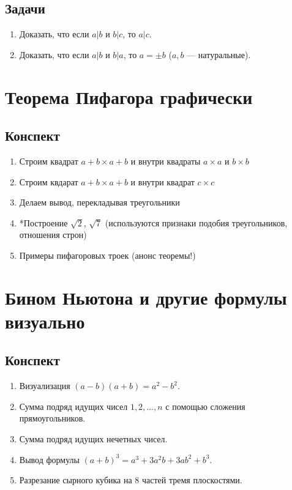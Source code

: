 \subsection{Задачи}
\begin{enumerate}
\item Доказать, что если $a|b$ и $b|c$, то $a|c$.
\item Доказать, что если $a|b$ и $b|a$, то $a=\pm b$ ($a,b$ --- натуральные).
\end{enumerate}


\section{Теорема Пифагора графически}

\subsection{Конспект}
\begin{enumerate}
\item Строим квадрат $a+b\times a+b$ и внутри квадраты $a\times a$ и $b\times b$
\item Строим квдарат $a+b\times a+b$ и внутри квадрат $c\times c$
\item Делаем вывод, перекладывая треугольники
\item *Построение $\sqrt 2$, $\sqrt 7$ (используются признаки подобия треугольников, отношения строн)
\item Примеры пифагоровых троек (анонс теоремы!)
\end{enumerate}

\section{Бином Ньютона и другие формулы визуально}

\subsection{Конспект}
\begin{enumerate}\setlength{\itemsep}{1pt}
\item Визуализация $(a-b)(a+b)=a^2-b^2$.
\item Сумма подряд идущих чисел $1,2,\dots,n$ с помощью сложения прямоугольников.
\item Сумма подряд идущих нечетных чисел.
\item Вывод формулы $(a+b)^3 = a^3+3a^2b+3ab^2+b^3$.
\item Разрезание сырного кубика на 8 частей тремя плоскостями.
\end{enumerate}
